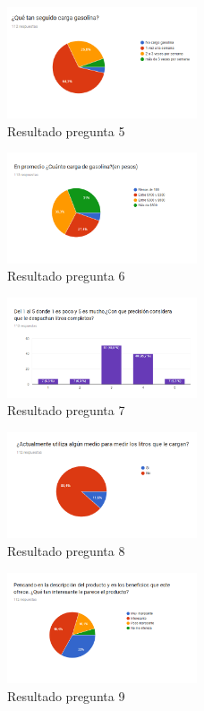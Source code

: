 \begin{figure}[H]
	\centering
	\includegraphics[width=0.5\textwidth]{Apendice2/img/FrecuenciaGasolina}
	\caption{Resultado pregunta 5}
\end{figure}
\begin{figure}[H]
	\centering
	\includegraphics[width=0.5\textwidth]{Apendice2/img/CargaGasolina}
	\caption{Resultado pregunta 6}
\end{figure}
\begin{figure}[H]
	\centering
	\includegraphics[width=0.5\textwidth]{Apendice2/img/Precision}
	\caption{Resultado pregunta 7}
\end{figure}
\begin{figure}[H]
	\centering
	\includegraphics[width=0.5\textwidth]{Apendice2/img/Metodo}
	\caption{Resultado pregunta 8}
\end{figure}
\begin{figure}[H]
	\centering
	\includegraphics[width=0.5\textwidth]{Apendice2/img/Interesante}
	\caption{Resultado pregunta 9}
\end{figure}
